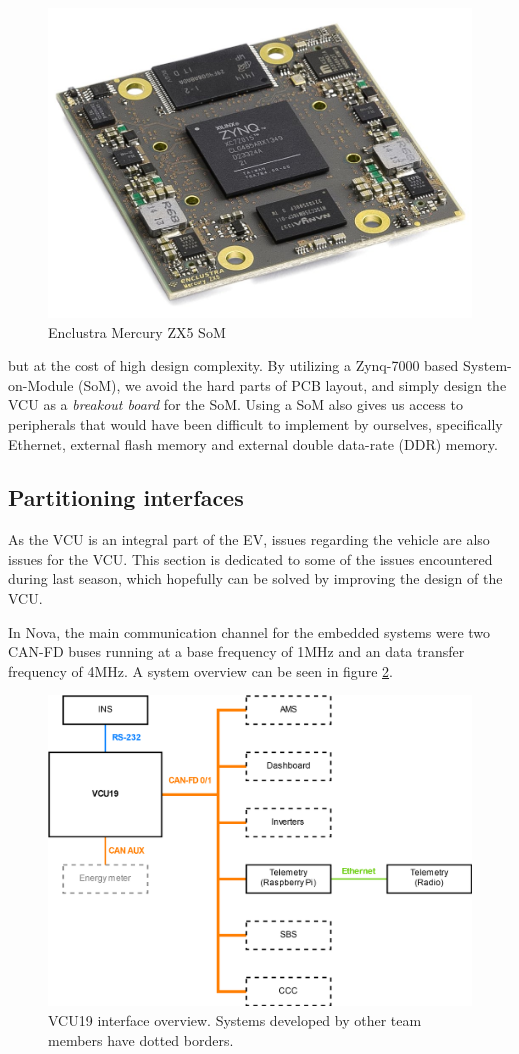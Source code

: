 \begin{figure}[H]
    \centering
    \includegraphics[width=.75\textwidth]{media/zx5.jpg}
    \caption{Enclustra Mercury ZX5 SoM}
    \label{fig:zx5}
\end{figure}

but at the cost of high design complexity. By utilizing a Zynq-7000 based System-on-Module (SoM), we avoid the hard parts of PCB layout, and simply design the VCU as a \emph{breakout board} for the SoM. Using a SoM also gives us access to peripherals that would have been difficult to implement by ourselves, specifically Ethernet, external flash memory and external double data-rate (DDR) memory.

\subsection{Partitioning interfaces}


As the VCU is an integral part of the EV, issues regarding the vehicle are also issues for the VCU. This section is dedicated to some of the issues encountered during last season, which hopefully can be solved by improving the design of the VCU.


In Nova, the main communication channel for the embedded systems were two CAN-FD buses running at a base frequency of 1MHz and an data transfer frequency of 4MHz. A system overview can be seen in figure \ref{fig:vcu19_system}.

\begin{figure}[h!]
    \centering
    \includegraphics[width=.85\textwidth]{media/vcu19_system.png}
    \caption{VCU19 interface overview. Systems developed by other team members have dotted borders.}
    \label{fig:vcu19_system}
\end{figure}

